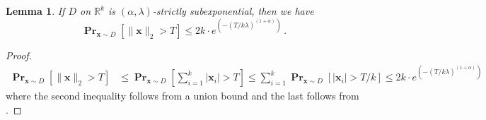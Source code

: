 \documentclass[10pt,a4paper]{article}
\newtheorem{lemma}{Lemma}[section]
\newcommand\twonorm[1]{\|#1\|_2}
\renewcommand\vec[1]{\mathbf{#1}}
\DeclareMathOperator*{\pr}{\mathbf{Pr}}
\newcommand{\R}{\mathbb{R}}
\newcommand{\1}{\Ind}
\newcommand{\x}{\vec x}
\begin{document}
\begin{lemma}
    \label{lem:norm_tail}
    If $D$ on $\R^k$ is $(\alpha,\lambda)$-strictly subexponential, then we have
    \[
    \pr_{\x\sim D}\left[\twonorm{\x}>T\right]\leq 2k\cdot e^{\left(-(T/k\lambda)^{(1+\alpha)}\right) }  \,.
    \]
\end{lemma}
 \begin{proof}
\begin{align*}
    \pr_{\x\sim D}\left[\twonorm{\x}>T\right]&\leq \pr_{\x\sim D}\left[\sum_{i=1}^{k}|\x_i|>T\right]
    \leq \sum_{i=1}^{k}\pr_{\x\sim D}\left[|\x_i|>T/k\right]
    \leq 2k\cdot e^{\left(-(T/k\lambda)^{(1+\alpha)}\right)}\,
\end{align*} where the second inequality follows from a union bound and the last follows from .
\end{proof}
\end{document}
